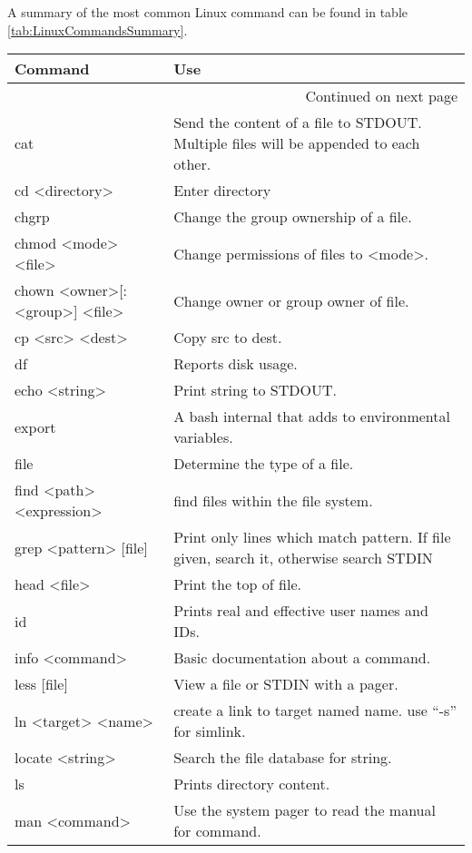 			A summary of the most common Linux command can be found in table \ref{tab:LinuxCommandsSummary}.
			\begin{center}
				\begin{longtable}{lp{6cm}}
					\toprule
					\textbf{Command} & \textbf{Use} \\
					\toprule
					\endhead
					\midrule
					\multicolumn{2}{r}{{Continued on next page}} \\
					\bottomrule
					\endfoot
					\bottomrule
					\endlastfoot
					cat & Send the content of a file to STDOUT.
							Multiple files will be appended to each other. \\
					cd <directory> & Enter directory \\
					chgrp & Change the group ownership of a file. \\
					chmod <mode> <file> & Change permissions of files to <mode>. \\
					chown <owner>[:<group>] <file> & Change owner or group owner of file. \\
					cp <src> <dest> & Copy src to dest. \\
					df & Reports disk usage. \\
					echo <string> & Print string to STDOUT. \\
					export & A bash internal that adds to environmental variables. \\
					file & Determine the type of a file. \\
					find <path> <expression> & find files within the file system. \\
					grep <pattern> [file] & Print only lines which match pattern.
											If file given, search it, otherwise search STDIN \\
					head <file> & Print the top of file. \\
					id & Prints real and effective user names and IDs. \\
					info <command> & Basic documentation about a command. \\
					less [file] & View a file or STDIN with a pager. \\
					ln <target> <name> & create a link to target named name.
										use ``-s'' for simlink. \\
					locate <string> & Search the file database for string. \\
					ls & Prints directory content. \\
					man <command> & Use the system pager to read the manual for command. \\

\end{longtable}
\end{center}
